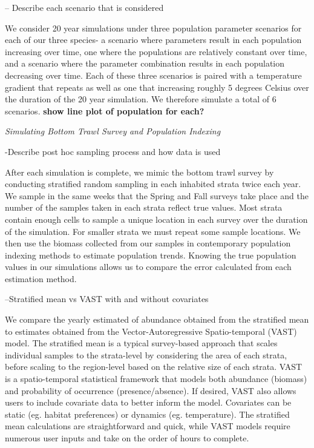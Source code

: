 \documentclass[
]{article}
\begin{document}
-- Describe each scenario that is considered

We consider 20 year simulations under three population parameter scenarios for each of our three species- a scenario where parameters result in each population increasing over time, one where the populations are relatively constant over time, and a scenario where the parameter combination results in each population decreasing over time. Each of these three scenarios is paired with a temperature gradient that repeats as well as one that increasing roughly 5 degrees Celsius over the duration of the 20 year simulation. We therefore simulate a total of 6 scenarios. \textbf{show line plot of population for each?}

\emph{Simulating Bottom Trawl Survey and Population Indexing}

-Describe post hoc sampling process and how data is used

After each simulation is complete, we mimic the bottom trawl survey by conducting stratified random sampling in each inhabited strata twice each year. We sample in the same weeks that the Spring and Fall surveys take place and the number of the samples taken in each strata reflect true values. Most strata contain enough cells to sample a unique location in each survey over the duration of the simulation. For smaller strata we must repeat some sample locations. We then use the biomass collected from our samples in contemporary population indexing methods to estimate population trends. Knowing the true population values in our simulations allows us to compare the error calculated from each estimation method.

--Stratified mean vs VAST with and without covariates

We compare the yearly estimated of abundance obtained from the stratified mean to estimates obtained from the Vector-Autoregressive Spatio-temporal (VAST) model. The stratified mean is a typical survey-based approach that scales individual samples to the strata-level by considering the area of each strata, before scaling to the region-level based on the relative size of each strata. VAST is a spatio-temporal statistical framework that models both abundance (biomass) and probability of occurrence (presence/absence). If desired, VAST also allows users to include covariate data to better inform the model. Covariates can be static (eg. habitat preferences) or dynamics (eg. temperature). The stratified mean calculations are straightforward and quick, while VAST models require numerous user inputs and take on the order of hours to complete.
\end{document}
